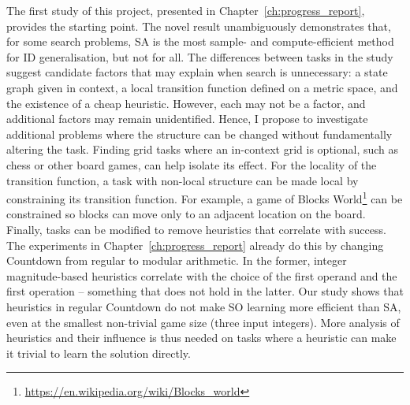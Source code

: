 The first study of this project, presented in Chapter~\ref{ch:progress_report}, provides the starting point.
The novel result unambiguously demonstrates that, for some search problems, SA is the most sample- and compute-efficient method for ID generalisation, but not for all.
The differences between tasks in the study suggest candidate factors that may explain when search is unnecessary: a state graph given in context, a local transition function defined on a metric space, and the existence of a cheap heuristic.
However, each may not be a factor, and additional factors may remain unidentified.
Hence, I propose to investigate additional problems where the structure can be changed without fundamentally altering the task.
Finding grid tasks where an in-context grid is optional, such as chess or other board games, can help isolate its effect.
For the locality of the transition function, a task with non-local structure can be made local by constraining its transition function.
For example, a game of Blocks World\footnote{\url{https://en.wikipedia.org/wiki/Blocks_world}} can be constrained so blocks can move only to an adjacent location on the board.
Finally, tasks can be modified to remove heuristics that correlate with success.
The experiments in Chapter~\ref{ch:progress_report} already do this by changing Countdown from regular to modular arithmetic.
In the former, integer magnitude-based heuristics correlate with the choice of the first operand and the first operation -- something that does not hold in the latter.
Our study shows that heuristics in regular Countdown do not make SO learning more efficient than SA, even at the smallest non-trivial game size (three input integers).
More analysis of heuristics and their influence is thus needed on tasks where a heuristic can make it trivial to learn the solution directly.

